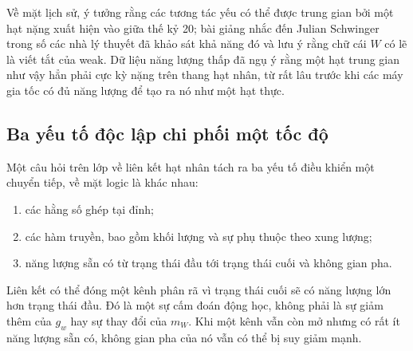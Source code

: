 Về mặt lịch sử, ý tưởng rằng các tương tác yếu có thể được trung gian bởi một hạt nặng xuất hiện vào giữa thế kỷ 20; bài giảng nhắc đến Julian Schwinger trong số các nhà lý thuyết đã khảo sát khả năng đó và lưu ý rằng chữ cái \(W\) có lẽ là viết tắt của weak. Dữ liệu năng lượng thấp đã ngụ ý rằng một hạt trung gian như vậy hẳn phải cực kỳ nặng trên thang hạt nhân, từ rất lâu trước khi các máy gia tốc có đủ năng lượng để tạo ra nó như một hạt thực.

\subsection{Ba yếu tố độc lập chi phối một tốc độ}

Một câu hỏi trên lớp về liên kết hạt nhân tách ra ba yếu tố điều khiển một chuyển tiếp, về mặt logic là khác nhau:
\begin{enumerate}
  \item các hằng số ghép tại đỉnh;
  \item các hàm truyền, bao gồm khối lượng và sự phụ thuộc theo xung lượng;
  \item năng lượng sẵn có từ trạng thái đầu tới trạng thái cuối và không gian pha.
\end{enumerate}
Liên kết có thể đóng một kênh phân rã vì trạng thái cuối sẽ có năng lượng lớn hơn trạng thái đầu. Đó là một sự cấm đoán động học, không phải là sự giảm thêm của \(g_w\) hay sự thay đổi của \(m_W\). Khi một kênh vẫn còn mở nhưng có rất ít năng lượng sẵn có, không gian pha của nó vẫn có thể bị suy giảm mạnh.

\begin{classroomqa}
\end{classroomqa}

\begin{classroomqa}
\end{classroomqa}

